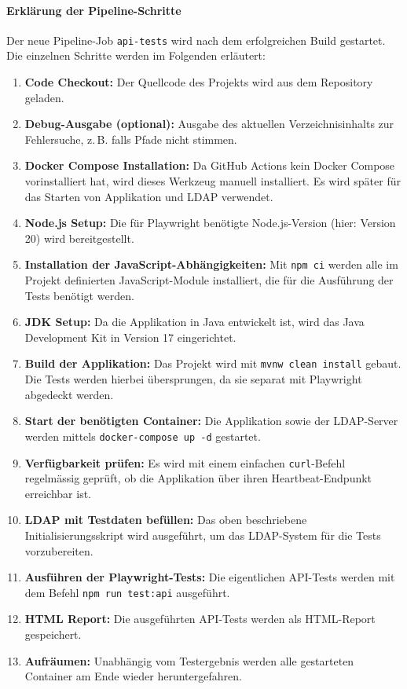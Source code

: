 \paragraph{Erklärung der Pipeline-Schritte}

Der neue Pipeline-Job \texttt{api-tests} wird nach dem erfolgreichen Build gestartet. Die einzelnen Schritte werden im Folgenden erläutert:

\begin{enumerate}
    \item \textbf{Code Checkout:} Der Quellcode des Projekts wird aus dem Repository geladen.
    \item \textbf{Debug-Ausgabe (optional):} Ausgabe des aktuellen Verzeichnisinhalts zur Fehlersuche, z.\,B. falls Pfade nicht stimmen.
    \item \textbf{Docker Compose Installation:} Da GitHub Actions kein Docker Compose vorinstalliert hat, wird dieses Werkzeug manuell installiert. Es wird später für das Starten von Applikation und LDAP verwendet.
    \item \textbf{Node.js Setup:} Die für Playwright benötigte Node.js-Version (hier: Version 20) wird bereitgestellt.
    \item \textbf{Installation der JavaScript-Abhängigkeiten:} Mit \texttt{npm ci} werden alle im Projekt definierten JavaScript-Module installiert, die für die Ausführung der Tests benötigt werden.
    \item \textbf{JDK Setup:} Da die Applikation in Java entwickelt ist, wird das Java Development Kit in Version 17 eingerichtet.
    \item \textbf{Build der Applikation:} Das Projekt wird mit \texttt{mvnw clean install} gebaut. Die Tests werden hierbei übersprungen, da sie separat mit Playwright abgedeckt werden.
    \item \textbf{Start der benötigten Container:} Die Applikation sowie der LDAP-Server werden mittels \texttt{docker-compose up -d} gestartet.
    \item \textbf{Verfügbarkeit prüfen:} Es wird mit einem einfachen \texttt{curl}-Befehl regelmässig geprüft, ob die Applikation über ihren Heartbeat-Endpunkt erreichbar ist.
    \item \textbf{LDAP mit Testdaten befüllen:} Das oben beschriebene Initialisierungsskript wird ausgeführt, um das LDAP-System für die Tests vorzubereiten.
    \item \textbf{Ausführen der Playwright-Tests:} Die eigentlichen API-Tests werden mit dem Befehl \texttt{npm run test:api} ausgeführt.
    \item \textbf{HTML Report:} Die ausgeführten API-Tests werden als HTML-Report gespeichert.
    \item \textbf{Aufräumen:} Unabhängig vom Testergebnis werden alle gestarteten Container am Ende wieder heruntergefahren.
\end{enumerate}

